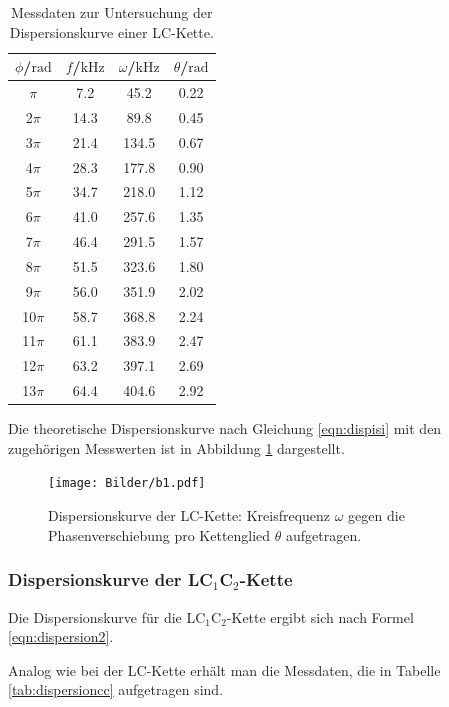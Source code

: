 \begin{table}
	\caption{Messdaten zur Untersuchung der Dispersionskurve einer LC-Kette.}
	\label{tab:dispersionlc}
	\centering
	\begin{tabular}{cccc}
	\toprule
	$\phi$/$\si{\radian}$ & $f$/$\si{\kilo\Hz}$ & $\omega$/$\si{\kilo\Hz}$ & $\theta$/$\si{\radian}$ \\
	\midrule
		$\pi$ & 7.2 & 45.2 & 0.22 \\
		2$\pi$ & 14.3 & 89.8 & 0.45 \\
		3$\pi$ & 21.4 & 134.5 & 0.67 \\
		4$\pi$ & 28.3 & 177.8 & 0.90 \\
		5$\pi$ & 34.7 & 218.0 & 1.12 \\
		6$\pi$ & 41.0 & 257.6 & 1.35 \\
		7$\pi$ & 46.4 & 291.5 & 1.57 \\
		8$\pi$ & 51.5 & 323.6 & 1.80 \\
		9$\pi$ & 56.0 & 351.9 & 2.02 \\
		10$\pi$ & 58.7 & 368.8 & 2.24 \\
		11$\pi$ & 61.1 & 383.9 & 2.47 \\
		12$\pi$ & 63.2 & 397.1 & 2.69 \\
		13$\pi$ & 64.4 & 404.6 & 2.92 \\
	\bottomrule
	\end{tabular}
\end{table}

Die theoretische Dispersionskurve nach Gleichung \eqref{eqn:dispisi} mit den zugehörigen
Messwerten ist in Abbildung \ref{fig:dispilc} dargestellt.

\begin{figure}
	\centering
	\texttt{[image: Bilder/b1.pdf]}
	\caption{Dispersionskurve der LC-Kette: Kreisfrequenz $\omega$ gegen die Phasenverschiebung pro Kettenglied $\theta$ aufgetragen.}
	\label{fig:dispilc}
\end{figure}

\FloatBarrier
\subsubsection{Dispersionskurve der LC$_1$C$_2$-Kette}
Die Dispersionskurve für die LC$_1$C$_2$-Kette ergibt sich nach Formel \eqref{eqn:dispersion2}.

Analog wie bei der LC-Kette erhält man die Messdaten, die in Tabelle \ref{tab:dispersioncc}
aufgetragen sind.

